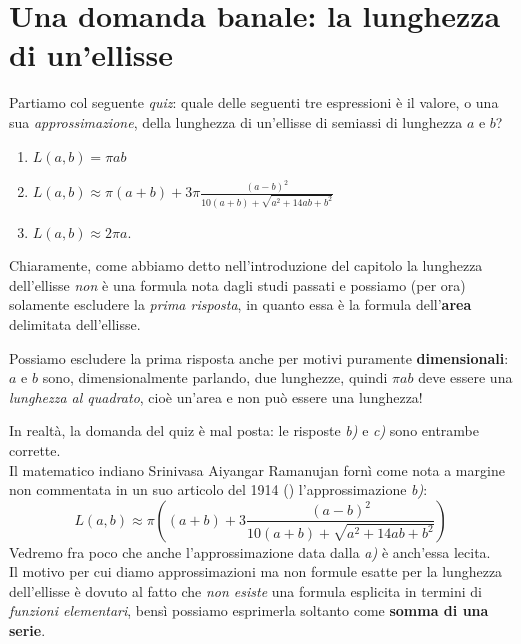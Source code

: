 \section{Una domanda banale: la lunghezza di un'ellisse}
Partiamo col seguente \textit{quiz}: quale delle seguenti tre espressioni è il valore, o una sua \textit{approssimazione}, della lunghezza di un'ellisse di semiassi di lunghezza $a$ e $b$?
\begin{enumerate}[label=\alph*)]
	\item $L\left(a,b\right)=\pi ab$
	\item $L\left(a,b\right)\approx \pi \left(a+b\right)+3\pi\frac{\left(a-b\right)^2}{10\left(a+b\right)+\sqrt{a^2+14ab+b^2}}$
	\item $L\left(a,b\right)\approx 2\pi a$.
\end{enumerate}
Chiaramente, come abbiamo detto nell'introduzione del capitolo la lunghezza dell'ellisse \textit{non} è una formula nota dagli studi passati e possiamo (per ora) solamente escludere la \textit{prima risposta}, in quanto essa è la formula dell'\textbf{area} delimitata dell'ellisse.
\begin{observe}
	  Possiamo escludere la prima risposta anche per motivi puramente \textbf{dimensionali}: $a$ e $b$ sono, dimensionalmente parlando, due lunghezze, quindi $\pi ab$ deve essere una \textit{lunghezza al quadrato}, cioè un'area e non può essere una lunghezza!
\end{observe}
In realtà, la domanda del quiz è mal posta: le risposte \textit{b)} e \textit{c)} sono entrambe corrette.\\
Il matematico indiano Srinivasa Aiyangar Ramanujan fornì come nota a margine non commentata in un suo articolo del 1914 (\cite{ramanujan:1914piapprox}) l'approssimazione \textit{b)}:
\begin{equation*}
	L\left(a,b\right)\approx \pi\left(\left(a+b\right)+3\frac{\left(a-b\right)^2}{10\left(a+b\right)+\sqrt{a^2+14ab+b^2}}\right)
\end{equation*}
Vedremo fra poco che anche l'approssimazione data dalla \textit{a)} è anch'essa lecita.\\
Il motivo per cui diamo approssimazioni ma non formule esatte per la lunghezza dell'ellisse è dovuto al fatto che \textit{non esiste} una formula esplicita in termini di \textit{funzioni elementari}, bensì possiamo esprimerla soltanto come \textbf{somma di una serie}.
